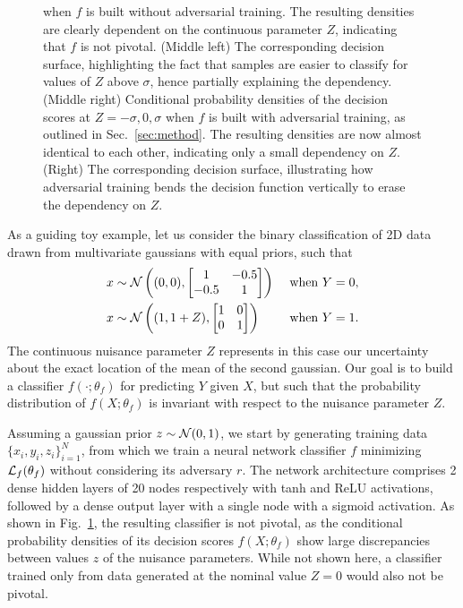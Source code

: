 \documentclass{article}
\theoremstyle{plain}
\begin{document}
\begin{figure}
{       when $f$ is built without adversarial training. The resulting densities
       are clearly dependent on the continuous parameter $Z$, indicating that $f$ is not pivotal.
    (Middle left) The corresponding decision surface, highlighting
       the fact that samples are easier to classify for values of $Z$ above $\sigma$,
       hence partially explaining the dependency.
    (Middle right) Conditional probability densities of the decision scores at $Z=-\sigma, 0, \sigma$ when $f$ is
       built with adversarial training, as outlined in Sec.~\ref{sec:method}.
       The resulting densities are now almost identical to each other, indicating only a
       small dependency on $Z$.
    (Right) The corresponding decision surface, illustrating how adversarial
       training bends the decision function vertically to erase the dependency on $Z$.
    }
    \label{fig:toy}
\end{figure}

As a guiding toy example, let us consider the binary classification of 2D
data drawn from multivariate gaussians with equal priors, such that
\begin{align}
    x &\sim {\cal N}\left ((0,0), \begin{bmatrix}
                              1 & -0.5 \\
                              -0.5 & 1
                            \end{bmatrix}\right) &\text{ when } Y=0, \\
    x &\sim {\cal N}\left ((1,1+Z),  \begin{bmatrix}
                              1 & 0 \\
                              0 & 1
                             \end{bmatrix}\right) &\text{ when } Y=1.
\end{align}
The continuous nuisance parameter $Z$ represents in this case our
uncertainty about the exact location of the mean of the second gaussian. Our goal is to
build a classifier $f(\cdot;\theta_f)$ for predicting $Y$ given $X$, but such that
the probability distribution of $f(X;\theta_f)$ is invariant with respect to the
nuisance parameter $Z$.

Assuming a gaussian prior $z \sim {\cal N}(0,1)$, we start by generating
training data $\{ x_i, y_i, z_i \}_{i=1}^N$, from which we train a neural
network classifier $f$ minimizing ${\cal L}_f(\theta_f)$ without considering its
adversary $r$. The network architecture comprises 2 dense hidden layers of 20
nodes respectively with tanh and ReLU activations, followed  by a dense output layer with a single
node with a sigmoid activation. As shown in Fig.~\ref{fig:toy}, the resulting
classifier is not pivotal, as the conditional probability densities of its
decision scores $f(X;\theta_f)$ show large discrepancies between values $z$ of
the nuisance parameters. While not shown here, a classifier trained only from data
generated at the nominal value $Z=0$ would also not be pivotal.
\end{document}
